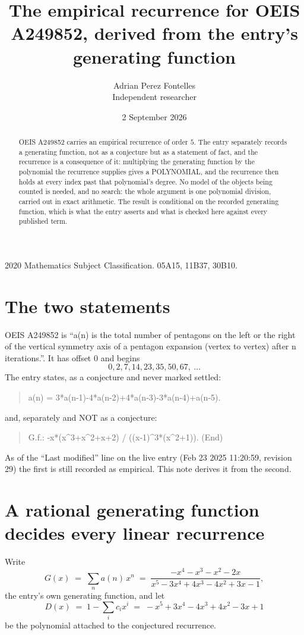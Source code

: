 \documentclass[11pt,a4paper]{article}
\title{The empirical recurrence for OEIS A249852, derived from the entry's generating function}
\author{Adrian Perez Fontelles\\ \small Independent researcher}
\date{2 September 2026}
\theoremstyle{plain}
\theoremstyle{definition}
\begin{document}
\maketitle

\begin{abstract}
OEIS A249852 carries an empirical recurrence of order $5$. The entry separately records a
generating function, not as a conjecture but as a statement of fact, and the recurrence is a
consequence of it: multiplying the generating function by the polynomial the recurrence
supplies gives a POLYNOMIAL, and the recurrence then holds at every index past that
polynomial's degree. No model of the objects being counted is needed, and no search: the
whole argument is one polynomial division, carried out in exact arithmetic. The result is
conditional on the recorded generating function, which is what the entry asserts and what is
checked here against every published term.
\end{abstract}

\noindent\small 2020 Mathematics Subject Classification. 05A15, 11B37, 30B10.\normalsize

\section{The two statements}

OEIS A249852 is ``a(n) is the total number of pentagons on the left or the right of the vertical symmetry axis of a pentagon expansion (vertex to vertex) after n iterations.''. It has offset $0$ and begins
\[
0, 2, 7, 14, 23, 35, 50, 67,\ \dots
\]
The entry states, as a conjecture and never marked settled:
\begin{quote}
a(n) = 3*a(n-1)-4*a(n-2)+4*a(n-3)-3*a(n-4)+a(n-5).
\end{quote}
and, separately and NOT as a conjecture:
\begin{quote}
G.f.: -x*(x\^{}3+x\^{}2+x+2) / ((x-1)\^{}3*(x\^{}2+1)). (End)
\end{quote}
As of the ``Last modified'' line on the live entry (Feb 23 2025 11:20:59, revision 29) the first is still
recorded as empirical. This note derives it from the second.

\section{A rational generating function decides every linear recurrence}

Write
\[
G(x)\;=\;\sum_{n}a(n)\,x^{n}\;=\;\frac{- x^{4} - x^{3} - x^{2} - 2 x}{x^{5} - 3 x^{4} + 4 x^{3} - 4 x^{2} + 3 x - 1},
\]
the entry's own generating function, and let
\[
D(x)\;=\;1-\sum_i c_i x^{i}\;=\;- x^{5} + 3 x^{4} - 4 x^{3} + 4 x^{2} - 3 x + 1
\]
be the polynomial attached to the conjectured recurrence.
\end{document}

